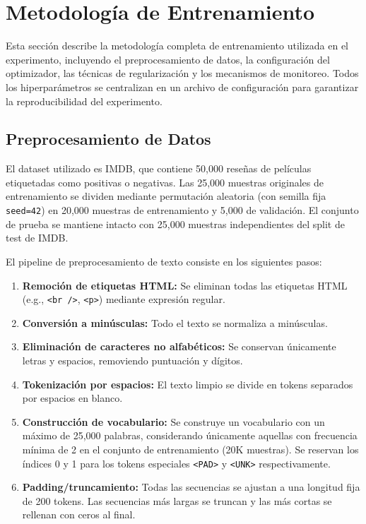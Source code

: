 \section{Metodología de Entrenamiento}

Esta sección describe la metodología completa de entrenamiento utilizada en el experimento,
incluyendo el preprocesamiento de datos, la configuración del optimizador, las técnicas de
regularización y los mecanismos de monitoreo. Todos los hiperparámetros se centralizan en
un archivo de configuración para garantizar la reproducibilidad del experimento.

\subsection{Preprocesamiento de Datos}

El dataset utilizado es IMDB, que contiene 50,000 reseñas de películas etiquetadas como
positivas o negativas. Las 25,000 muestras originales de entrenamiento se dividen mediante
permutación aleatoria (con semilla fija \texttt{seed=42}) en 20,000 muestras de entrenamiento
y 5,000 de validación. El conjunto de prueba se mantiene intacto con 25,000 muestras
independientes del split de test de IMDB.

El pipeline de preprocesamiento de texto consiste en los siguientes pasos:
\begin{enumerate}
    \item \textbf{Remoción de etiquetas HTML:} Se eliminan todas las etiquetas HTML
          (e.g., \texttt{<br />}, \texttt{<p>}) mediante expresión regular.
    \item \textbf{Conversión a minúsculas:} Todo el texto se normaliza a minúsculas.
    \item \textbf{Eliminación de caracteres no alfabéticos:} Se conservan únicamente
          letras y espacios, removiendo puntuación y dígitos.
    \item \textbf{Tokenización por espacios:} El texto limpio se divide en tokens
          separados por espacios en blanco.
    \item \textbf{Construcción de vocabulario:} Se construye un vocabulario con un máximo
          de 25,000 palabras, considerando únicamente aquellas con frecuencia mínima de 2
          en el conjunto de entrenamiento (20K muestras). Se reservan los índices 0 y 1
          para los tokens especiales \texttt{<PAD>} y \texttt{<UNK>} respectivamente.
    \item \textbf{Padding/truncamiento:} Todas las secuencias se ajustan a una longitud
          fija de 200 tokens. Las secuencias más largas se truncan y las más cortas se
          rellenan con ceros al final.
\end{enumerate}

